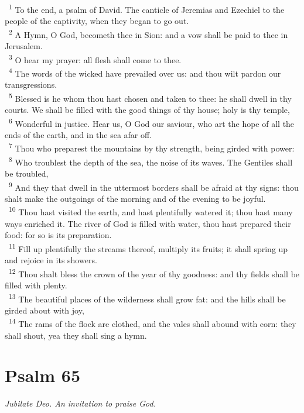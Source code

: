 \documentclass[a5paper,12pt]{article}
\begin{document}
\begin{multicols*}{2}
~\textsuperscript{1} To the end, a psalm of David. The canticle of Jeremias and Ezechiel to the people of the captivity, when they began to go out.\\
~\textsuperscript{2} A Hymn, O God, becometh thee in Sion: and a vow shall be paid to thee in Jerusalem.\\
~\textsuperscript{3} O hear my prayer: all flesh shall come to thee.\\
~\textsuperscript{4} The words of the wicked have prevailed over us: and thou wilt pardon our transgressions.\\
~\textsuperscript{5} Blessed is he whom thou hast chosen and taken to thee: he shall dwell in thy courts. We shall be filled with the good things of thy house; holy is thy temple,\\
~\textsuperscript{6} Wonderful in justice. Hear us, O God our saviour, who art the hope of all the ends of the earth, and in the sea afar off.\\
~\textsuperscript{7} Thou who preparest the mountains by thy strength, being girded with power:\\
~\textsuperscript{8} Who troublest the depth of the sea, the noise of its waves. The Gentiles shall be troubled,\\
~\textsuperscript{9} And they that dwell in the uttermost borders shall be afraid at thy signs: thou shalt make the outgoings of the morning and of the evening to be joyful.\\
~\textsuperscript{10} Thou hast visited the earth, and hast plentifully watered it; thou hast many ways enriched it. The river of God is filled with water, thou hast prepared their food: for so is its preparation.\\
~\textsuperscript{11} Fill up plentifully the streams thereof, multiply its fruits; it shall spring up and rejoice in its showers.\\
~\textsuperscript{12} Thou shalt bless the crown of the year of thy goodness: and thy fields shall be filled with plenty.\\
~\textsuperscript{13} The beautiful places of the wilderness shall grow fat: and the hills shall be girded about with joy,\\
~\textsuperscript{14} The rams of the flock are clothed, and the vales shall abound with corn: they shall shout, yea they shall sing a hymn.\\

\section{Psalm 65}
\label{sec:org646c91d}
\emph{Jubilate Deo. An invitation to praise God.}\\


\end{multicols*}
\end{document}

